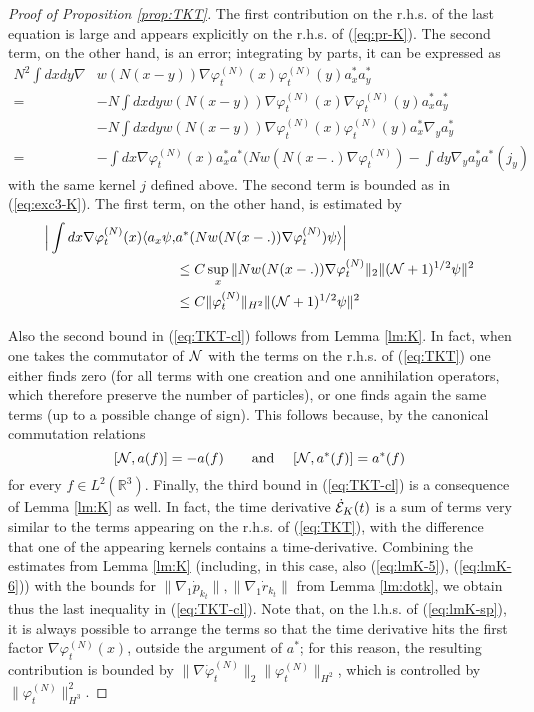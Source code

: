 \documentclass[11pt,a4paper]{article}
\newcommand{\bR}{{\mathbb R}}
\newcommand{\cE}{{\cal E}}
\newcommand{\cN}{{\cal N}}
\begin{document}
\begin{proof}[Proof of Proposition \ref{prop:TKT}]
The first contribution on the r.h.s. of the last equation is large and appears explicitly on the r.h.s. of (\ref{eq:pr-K}). The second term, on the other hand, is an error; integrating by parts, it can be expressed as
\[ \begin{split} N^2 \int dx dy \nabla &w (N (x-y)) \nabla \varphi^{(N)}_t (x) \varphi_t^{(N)} (y) a_x^* a_y^* \\ = \; &- N \int dx dy  w (N (x-y)) \nabla \varphi^{(N)}_t (x) \nabla \varphi_t^{(N)} (y) a_x^* a_y^* \\ &- N \int dx dy w (N (x-y)) \nabla \varphi^{(N)}_t (x)  \varphi_t^{(N)} (y) a_x^* \nabla_y a_y^*  \\ = \; &- \int dx \nabla \varphi_t^{(N)} (x) a_x^* a^* (N w(N(x-.) \nabla \varphi_t^{(N)}) - \int dy  \nabla_y a_y^* a^* (j_y) \end{split} \]
with the same kernel $j$ defined above. The second term is bounded as in (\ref{eq:exc3-K}). The first term, on the other hand, is estimated by
\begin{equation}\label{eq:lmK-sp} \begin{split}\Big|   \int dx \nabla \varphi_t^{(N)} (x)  \langle a_x \psi, &a^* (N w(N(x-.)) \nabla \varphi_t^{(N)}) \psi \rangle \Big| \\ &\leq C \sup_x \| N w(N(x-.)) \nabla \varphi_t^{(N)} \|_2 \| (\cN+1)^{1/2} \psi \|^2 \\ &\leq C \| \varphi_t^{(N)} \|_{H^2} \| (\cN+1)^{1/2} \psi \|^2   \end{split} \end{equation}

Also the second bound in (\ref{eq:TKT-cl}) follows from Lemma \ref{lm:K}. In fact, when one takes the commutator of $\cN$ with the terms on the r.h.s. of (\ref{eq:TKT}) one either finds zero (for all terms with one creation and one annihilation operators, which therefore preserve the number of particles), or one finds again the same terms (up to a possible change of sign). This follows because, by the canonical commutation relations
\[ [ \cN , a (f) ] = - a (f) \qquad \text{and } \quad [\cN , a^* (f)] = a^* (f) \]
for every $f \in L^2 (\bR^3)$. Finally, the third bound in (\ref{eq:TKT-cl}) is a consequence of Lemma \ref{lm:K} as well. In fact, the time derivative $\dot{\cE}_K (t)$ is a sum of terms very similar to the terms appearing on the r.h.s. of (\ref{eq:TKT}), with the difference that one of the appearing kernels contains a time-derivative. Combining the estimates from Lemma \ref{lm:K} (including, in this case, also (\ref{eq:lmK-5}), (\ref{eq:lmK-6})) with the bounds for $\| \nabla_1 \dot{p}_{k_t} \|, \| \nabla_1 \dot{r}_{k_t} \|$ from Lemma \ref{lm:dotk}, we obtain thus the last inequality in (\ref{eq:TKT-cl}). Note that, on the l.h.s. of (\ref{eq:lmK-sp}), it is always possible to arrange the terms so that the time derivative hits the first factor $\nabla \varphi_t^{(N)} (x)$, outside the argument of $a^*$; for this reason, the resulting contribution is bounded by $\| \nabla \dot{\varphi}_t^{(N)} \|_2 \| \varphi_t^{(N)} \|_{H^2}$, which is controlled by $\| \varphi_t^{(N)}\|_{H^3}^2$. 
\end{proof}
\end{document}
